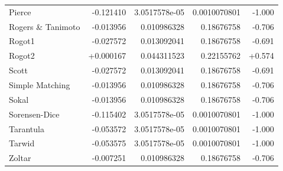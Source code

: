 \begin{longtable}{lrrrr}
Pierce & -0.121410 & 3.0517578e-05 & 0.0010070801 & -1.000 \\
Rogers \& Tanimoto & -0.013956 & 0.010986328 & 0.18676758 & -0.706 \\
Rogot1 & -0.027572 & 0.013092041 & 0.18676758 & -0.691 \\
Rogot2 & +0.000167 & 0.044311523 & 0.22155762 & +0.574 \\
Scott & -0.027572 & 0.013092041 & 0.18676758 & -0.691 \\
Simple Matching & -0.013956 & 0.010986328 & 0.18676758 & -0.706 \\
Sokal & -0.013956 & 0.010986328 & 0.18676758 & -0.706 \\
Sorensen-Dice & -0.115402 & 3.0517578e-05 & 0.0010070801 & -1.000 \\
Tarantula & -0.053572 & 3.0517578e-05 & 0.0010070801 & -1.000 \\
Tarwid & -0.053575 & 3.0517578e-05 & 0.0010070801 & -1.000 \\
Zoltar & -0.007251 & 0.010986328 & 0.18676758 & -0.706 \\
\bottomrule
\end{longtable}
